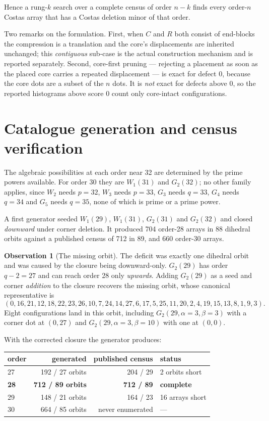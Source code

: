 \documentclass[11pt,a4paper,oneside]{report}
\theoremstyle{definition}
\newtheorem{observation}[theorem]{Observation}
\begin{document}
\noindent Hence a rung-$k$ search over a complete census of order $n-k$ finds every order-$n$ Costas
array that has a Costas deletion minor of that order.

Two remarks on the formulation. First, when $C$ and $R$ both consist of
end-blocks the compression is a translation and the core's displacements are
inherited unchanged; this \emph{contiguous} sub-case is the actual construction
mechanism and is reported separately. Second, core-first pruning --- rejecting a
placement as soon as the placed core carries a repeated displacement --- is
exact for defect 0, because the core dots are a subset of the $n$ dots. It is
\emph{not} exact for defects above 0, so the reported histograms above score 0
count only core-intact configurations.

\section{Catalogue generation and census verification}
\label{p3-sec:catalogue}

The algebraic possibilities at each order near 32 are determined by the prime
powers available. For order 30 they are $W_1(31)$ and $G_2(32)$; no other family
applies, since $W_2$ needs $p=32$, $W_3$ needs $p=33$, $G_3$ needs $q=33$, $G_4$
needs $q=34$ and $G_5$ needs $q=35$, none of which is prime or a prime power.

A first generator seeded $W_1(29)$, $W_1(31)$, $G_2(31)$ and $G_2(32)$ and
closed \emph{downward} under corner deletion. It produced 704 order-28 arrays in
88 dihedral orbits against a published census of 712 in 89, and 660 order-30
arrays.

\begin{observation}[The missing orbit]
\label{p3-obs:missing}
The deficit was exactly one dihedral orbit and was caused by the closure being
downward-only. $G_2(29)$ has order $q-2 = 27$ and can reach order 28 only
\emph{upwards}. Adding $G_2(29)$ as a seed and corner \emph{addition} to the
closure recovers the missing orbit, whose canonical representative is
\[
(0,16,21,12,18,22,23,26,10,7,24,14,27,6,17,5,25,11,20,2,4,19,15,13,8,1,9,3).
\]
Eight configurations land in this orbit, including $G_2(29,\alpha=3,\beta=3)$
with a corner dot at $(0,27)$ and $G_2(29,\alpha=3,\beta=10)$ with one at
$(0,0)$.
\end{observation}

With the corrected closure the generator produces:

\begin{center}
\begin{tabular}{@{}lrrl@{}}
\toprule
order & generated & published census & status \\
\midrule
27 & 192 / 27 orbits & 204 / 29 & 2 orbits short \\
\textbf{28} & \textbf{712 / 89 orbits} & \textbf{712 / 89} & \textbf{complete} \\
29 & 148 / 21 orbits & 164 / 23 & 16 arrays short \\
30 & 664 / 85 orbits & never enumerated & --- \\
\bottomrule
\end{tabular}
\end{center}
\end{document}
